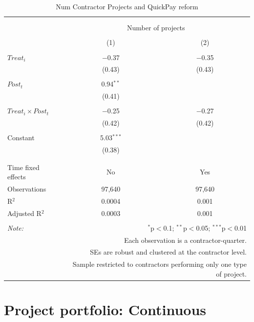 \documentclass[
]{article}
\begin{document}
\begin{table}[H] \centering 
  \caption{Num Contractor Projects and QuickPay reform} 
  \label{} 
\small 
\begin{tabular}{@{\extracolsep{-2pt}}lcc} 
\\[-1.8ex]\hline 
\hline \\[-1.8ex] 
\\[-1.8ex] & \multicolumn{2}{c}{Number of projects} \\ 
\\[-1.8ex] & (1) & (2)\\ 
\hline \\[-1.8ex] 
 $Treat_i$ & $-$0.37 & $-$0.35 \\ 
  & (0.43) & (0.43) \\ 
  & & \\ 
 $Post_t$ & 0.94$^{**}$ &  \\ 
  & (0.41) &  \\ 
  & & \\ 
 $Treat_i \times Post_t$ & $-$0.25 & $-$0.27 \\ 
  & (0.42) & (0.42) \\ 
  & & \\ 
 Constant & 5.03$^{***}$ &  \\ 
  & (0.38) &  \\ 
  & & \\ 
\hline \\[-1.8ex] 
Time fixed effects & No & Yes \\ 
Observations & 97,640 & 97,640 \\ 
R$^{2}$ & 0.0004 & 0.001 \\ 
Adjusted R$^{2}$ & 0.0003 & 0.001 \\ 
\hline 
\hline \\[-1.8ex] 
\textit{Note:}  & \multicolumn{2}{r}{$^{*}$p$<$0.1; $^{**}$p$<$0.05; $^{***}$p$<$0.01} \\ 
 & \multicolumn{2}{r}{Each observation is a contractor-quarter.} \\ 
 & \multicolumn{2}{r}{SEs are robust and clustered at the contractor level.} \\ 
 & \multicolumn{2}{r}{Sample restricted to contractors performing only one type of project.} \\ 
\end{tabular} 
\end{table}

\hypertarget{project-portfolio-continuous}{%
\section{Project portfolio:
Continuous}\label{project-portfolio-continuous}}
\end{document}
